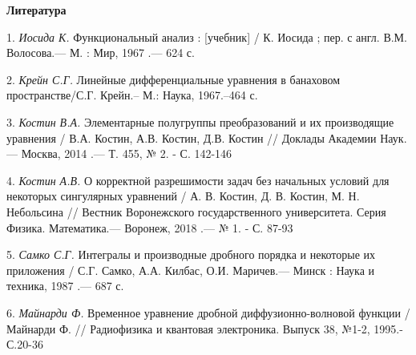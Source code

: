 \smallskip \centerline {\bf Литература} \nopagebreak

1. {\it Иосида К.} Функциональный анализ : [учебник] / К. Иосида ; пер. с англ. В.М. Волосова.— М. : Мир, 1967 .— 624 с.

2. {\it Крейн С.Г.} Линейные дифференциальные уравнения в банаховом
пространстве/С.Г. Крейн.-- М.: Наука, 1967.--464 с.

3. {\it Костин В.А.} Элементарные полугруппы преобразований и их производящие уравнения / В.А. Костин, А.В. Костин, Д.В. Костин // Доклады Академии Наук.— Москва, 2014 .— Т. 455, № 2. - С. 142-146

4. {\it Костин А.В.} О корректной разрешимости задач без начальных условий для некоторых сингулярных уравнений / А. В. Костин, Д. В. Костин, М. Н. Небольсина // Вестник Воронежского государственного университета. Серия Физика. Математика.— Воронеж, 2018 .— № 1. - С. 87-93

5. {\it Самко С.Г.} Интегралы и производные дробного порядка и некоторые их приложения / С.Г. Самко, А.А. Килбас, О.И. Маричев.— Минск : Наука и техника, 1987 .— 687 с.

6. {\it Майнарди Ф.} Временное уравнение дробной диффузионно-волновой функции /Майнарди Ф. // Радиофизика и квантовая электроника. Выпуск 38, №1-2, 1995.-С.20-36
